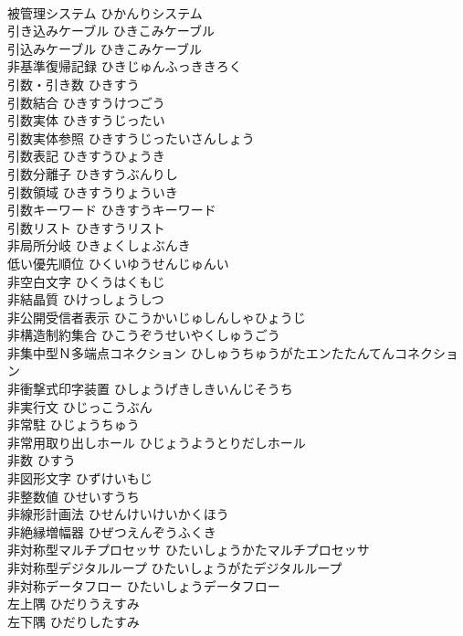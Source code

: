 \documentclass[8pt]{extreport}
\begin{document}
\begin{CJK}{UTF8}{min}
\\	被管理システム	ひかんりシステム	
\\	引き込みケーブル	ひきこみケーブル	
\\	引込みケーブル	ひきこみケーブル	
\\	非基準復帰記録	ひきじゅんふっききろく	
\\	引数・引き数	ひきすう	
\\	引数結合	ひきすうけつごう	
\\	引数実体	ひきすうじったい	
\\	引数実体参照	ひきすうじったいさんしょう	
\\	引数表記	ひきすうひょうき	
\\	引数分離子	ひきすうぶんりし	
\\	引数領域	ひきすうりょういき	
\\	引数キーワード	ひきすうキーワード	
\\	引数リスト	ひきすうリスト	
\\	非局所分岐	ひきょくしょぶんき	
\\	低い優先順位	ひくいゆうせんじゅんい	
\\	非空白文字	ひくうはくもじ	
\\	非結晶質	ひけっしょうしつ	
\\	非公開受信者表示	ひこうかいじゅしんしゃひょうじ	
\\	非構造制約集合	ひこうぞうせいやくしゅうごう	
\\	非集中型Ｎ多端点コネクション	ひしゅうちゅうがたエンたたんてんコネクション	
\\	非衝撃式印字装置	ひしょうげきしきいんじそうち	
\\	非実行文	ひじっこうぶん	
\\	非常駐	ひじょうちゅう	
\\	非常用取り出しホール	ひじょうようとりだしホール	
\\	非数	ひすう	
\\	非図形文字	ひずけいもじ	
\\	非整数値	ひせいすうち	
\\	非線形計画法	ひせんけいけいかくほう	
\\	非絶縁増幅器	ひぜつえんぞうふくき	
\\	非対称型マルチプロセッサ	ひたいしょうかたマルチプロセッサ	
\\	非対称型デジタルループ	ひたいしょうがたデジタルループ	
\\	非対称データフロー	ひたいしょうデータフロー	
\\	左上隅	ひだりうえすみ	
\\	左下隅	ひだりしたすみ	

\end{CJK}
\end{document}
